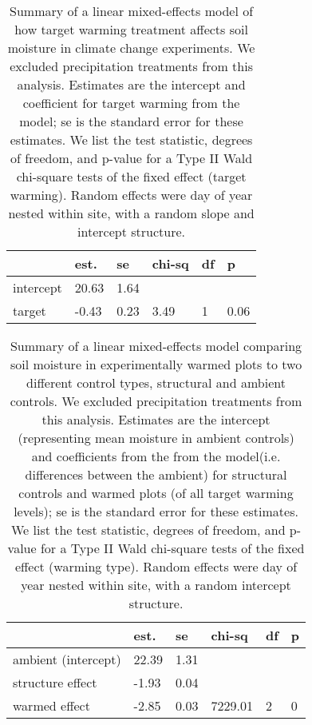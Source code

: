 \documentclass{article}
\begin{document}
\begin{table}[ht]
\centering
\caption{Summary of a linear mixed-effects model of how target warming treatment affects soil moisture in climate change experiments. We excluded precipitation treatments from this analysis. Estimates are the intercept  and coefficient for target warming from the model; se is the standard error for these estimates. We list the test statistic, degrees of freedom, and p-value for a Type II Wald chi-square tests of the fixed effect (target warming). Random effects were day of year nested within site, with a random slope and intercept structure.} 
\label{table:targsoilmois}
\begin{tabular}{|p{}|p{}p{}p{}p{}p{}|}
  \hline
 & est. & se & chi-sq & df & p \\ 
  \hline
intercept & 20.63 & 1.64 &  &  &  \\ 
  target & -0.43 & 0.23 & 3.49 & 1 & 0.06 \\ 
   \hline
\end{tabular}
\end{table}%
\begin{table}[ht]
\centering
\caption{Summary of a linear mixed-effects model comparing soil moisture in experimentally warmed plots to two different control types, structural and ambient controls. We excluded precipitation treatments from this analysis. Estimates are the intercept (representing mean moisture in ambient controls)  and coefficients from the from the model(i.e. differences between the ambient) for structural controls and warmed plots (of all target warming levels); se is the standard error for these estimates. We list the test statistic, degrees of freedom, and p-value for a Type II Wald chi-square tests of the fixed effect (warming type). Random effects were day of year nested within site, with a random intercept structure.} 
\label{table:warmsoilmois}
\begin{tabular}{|p{}|p{}p{}p{}p{}p{}|}
  \hline
 & est. & se & chi-sq & df & p \\ 
  \hline
ambient (intercept) & 22.39 & 1.31 &  &  &  \\ 
  structure effect & -1.93 & 0.04 &  &  &  \\ 
  warmed effect & -2.85 & 0.03 & 7229.01 & 2 & 0 \\ 
   \hline
\end{tabular}
\end{table}
\end{document}
